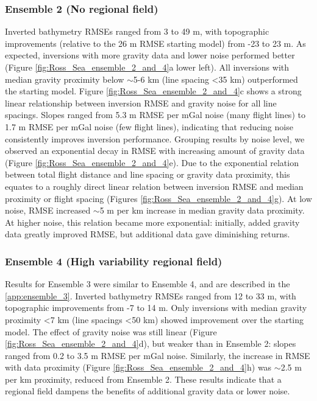 \documentclass[tc, manuscript]{copernicus}
\begin{document}
\subsubsection{Ensemble 2 (No regional field)}
Inverted bathymetry RMSEs ranged from 3 to 49 m, with topographic improvements (relative to the 26 m RMSE starting model) from -23 to 23 m. As expected, inversions with more gravity data and lower noise performed better (Figure \ref{fig:Ross_Sea_ensemble_2_and_4}a lower left). All inversions with median gravity proximity below $\sim$5-6 km (line spacing \textless35 km) outperformed the starting model. Figure \ref{fig:Ross_Sea_ensemble_2_and_4}c shows a strong linear relationship between inversion RMSE and gravity noise for all line spacings. Slopes ranged from 5.3 m RMSE per mGal noise (many flight lines) to 1.7 m RMSE per mGal noise (few flight lines), indicating that reducing noise consistently improves inversion performance.  Grouping results by noise level, we observed an exponential decay in RMSE with increasing amount of gravity data (Figure \ref{fig:Ross_Sea_ensemble_2_and_4}e). Due to the exponential relation between total flight distance and line spacing or gravity data proximity, this equates to a roughly direct linear relation between inversion RMSE and median proximity or flight spacing (Figures \ref{fig:Ross_Sea_ensemble_2_and_4}g). At low noise, RMSE increased $\sim$5 m per km increase in median gravity data proximity. At higher noise, this relation became more exponential: initially, added gravity data greatly improved RMSE, but additional data gave diminishing returns.

\subsubsection{Ensemble 4 (High variability regional field)}
Results for Ensemble 3 were similar to Ensemble 4, and are described in the \ref{app:ensemble_3}. Inverted bathymetry RMSEs ranged from 12 to 33 m, with topographic improvements from -7 to 14 m. Only inversions with median gravity proximity \textless 7 km (line spacings \textless 50 km) showed improvement over the starting model. The effect of gravity noise was still linear (Figure \ref{fig:Ross_Sea_ensemble_2_and_4}d), but weaker than in Ensemble 2: slopes ranged from 0.2 to 3.5 m RMSE per mGal noise. Similarly, the increase in RMSE with data proximity (Figure \ref{fig:Ross_Sea_ensemble_2_and_4}h) was $\sim$2.5 m per km proximity, reduced from Ensemble 2. These results indicate that a regional field dampens the benefits of additional gravity data or lower noise.
\end{document}

